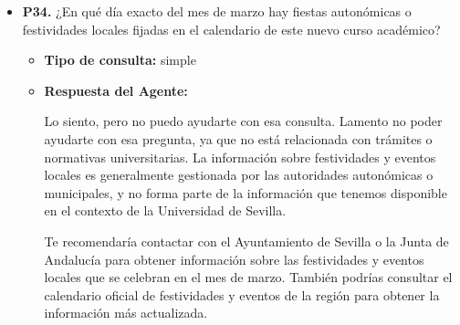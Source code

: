 \documentclass{article}
\begin{document}
\begin{itemize}
  \item \textbf{P34.} ¿En qué día exacto del mes de marzo hay fiestas autonómicas o festividades locales fijadas en el calendario de este nuevo curso académico? \\
        \begin{itemize}
          \item \textbf{Tipo de consulta:} simple
          \item \textbf{Respuesta del Agente:}

                Lo siento, pero no puedo ayudarte con esa consulta. Lamento no poder ayudarte con esa pregunta, ya que no está relacionada con trámites o normativas universitarias. La información sobre festividades y eventos locales es generalmente gestionada por las autoridades autonómicas o municipales, y no forma parte de la información que tenemos disponible en el contexto de la Universidad de Sevilla.

                Te recomendaría contactar con el Ayuntamiento de Sevilla o la Junta de Andalucía para obtener información sobre las festividades y eventos locales que se celebran en el mes de marzo. También podrías consultar el calendario oficial de festividades y eventos de la región para obtener la información más actualizada.
        \end{itemize}


\end{itemize}
\end{document}
